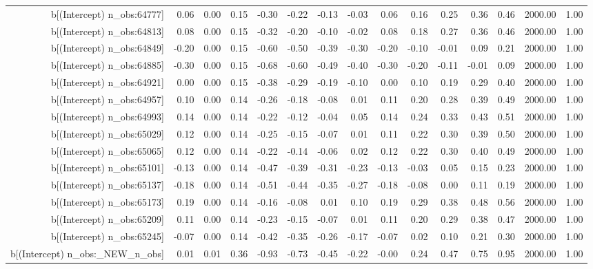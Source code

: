 \begin{table}[ht]
\begin{tabular}{rrrrrrrrrrrrrrr}
  b[(Intercept) n\_obs:64777] & 0.06 & 0.00 & 0.15 & -0.30 & -0.22 & -0.13 & -0.03 & 0.06 & 0.16 & 0.25 & 0.36 & 0.46 & 2000.00 & 1.00 \\ 
  b[(Intercept) n\_obs:64813] & 0.08 & 0.00 & 0.15 & -0.32 & -0.20 & -0.10 & -0.02 & 0.08 & 0.18 & 0.27 & 0.36 & 0.46 & 2000.00 & 1.00 \\ 
  b[(Intercept) n\_obs:64849] & -0.20 & 0.00 & 0.15 & -0.60 & -0.50 & -0.39 & -0.30 & -0.20 & -0.10 & -0.01 & 0.09 & 0.21 & 2000.00 & 1.00 \\ 
  b[(Intercept) n\_obs:64885] & -0.30 & 0.00 & 0.15 & -0.68 & -0.60 & -0.49 & -0.40 & -0.30 & -0.20 & -0.11 & -0.01 & 0.09 & 2000.00 & 1.00 \\ 
  b[(Intercept) n\_obs:64921] & 0.00 & 0.00 & 0.15 & -0.38 & -0.29 & -0.19 & -0.10 & 0.00 & 0.10 & 0.19 & 0.29 & 0.40 & 2000.00 & 1.00 \\ 
  b[(Intercept) n\_obs:64957] & 0.10 & 0.00 & 0.14 & -0.26 & -0.18 & -0.08 & 0.01 & 0.11 & 0.20 & 0.28 & 0.39 & 0.49 & 2000.00 & 1.00 \\ 
  b[(Intercept) n\_obs:64993] & 0.14 & 0.00 & 0.14 & -0.22 & -0.12 & -0.04 & 0.05 & 0.14 & 0.24 & 0.33 & 0.43 & 0.51 & 2000.00 & 1.00 \\ 
  b[(Intercept) n\_obs:65029] & 0.12 & 0.00 & 0.14 & -0.25 & -0.15 & -0.07 & 0.01 & 0.11 & 0.22 & 0.30 & 0.39 & 0.50 & 2000.00 & 1.00 \\ 
  b[(Intercept) n\_obs:65065] & 0.12 & 0.00 & 0.14 & -0.22 & -0.14 & -0.06 & 0.02 & 0.12 & 0.22 & 0.30 & 0.40 & 0.49 & 2000.00 & 1.00 \\ 
  b[(Intercept) n\_obs:65101] & -0.13 & 0.00 & 0.14 & -0.47 & -0.39 & -0.31 & -0.23 & -0.13 & -0.03 & 0.05 & 0.15 & 0.23 & 2000.00 & 1.00 \\ 
  b[(Intercept) n\_obs:65137] & -0.18 & 0.00 & 0.14 & -0.51 & -0.44 & -0.35 & -0.27 & -0.18 & -0.08 & 0.00 & 0.11 & 0.19 & 2000.00 & 1.00 \\ 
  b[(Intercept) n\_obs:65173] & 0.19 & 0.00 & 0.14 & -0.16 & -0.08 & 0.01 & 0.10 & 0.19 & 0.29 & 0.38 & 0.48 & 0.56 & 2000.00 & 1.00 \\ 
  b[(Intercept) n\_obs:65209] & 0.11 & 0.00 & 0.14 & -0.23 & -0.15 & -0.07 & 0.01 & 0.11 & 0.20 & 0.29 & 0.38 & 0.47 & 2000.00 & 1.00 \\ 
  b[(Intercept) n\_obs:65245] & -0.07 & 0.00 & 0.14 & -0.42 & -0.35 & -0.26 & -0.17 & -0.07 & 0.02 & 0.10 & 0.21 & 0.30 & 2000.00 & 1.00 \\ 
  b[(Intercept) n\_obs:\_NEW\_n\_obs] & 0.01 & 0.01 & 0.36 & -0.93 & -0.73 & -0.45 & -0.22 & -0.00 & 0.24 & 0.47 & 0.75 & 0.95 & 2000.00 & 1.00 \\ 

\end{tabular}
\end{table}
